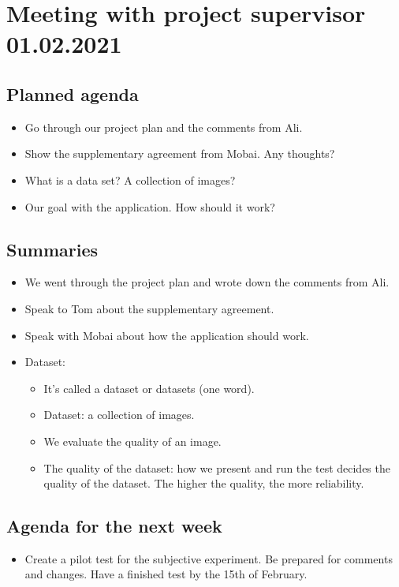 \newpage

\section*{Meeting with project supervisor 01.02.2021}
\subsection*{Planned agenda}
\begin{itemize}
    \item Go through our project plan and the comments from Ali.
    \item Show the supplementary agreement from Mobai. Any thoughts?
    \item What is a data set? A collection of images?
    \item Our goal with the application. How should it work?
\end{itemize}

\subsection*{Summaries}
\begin{itemize}
    \item We went through the project plan and wrote down the comments from Ali.
    \item Speak to Tom about the supplementary agreement.
    \item Speak with Mobai about how the application should work. 
    \item Dataset:
    \begin{itemize}
        \item It’s called a dataset or datasets (one word). \item Dataset: a collection of images.
        \item We evaluate the quality of an image.
        \item The quality of the dataset: how we present and run the test decides the quality of the dataset. The higher the quality, the more reliability.
    \end{itemize}
\end{itemize}

\subsection*{Agenda for the next week}
\begin{itemize}
    \item Create a pilot test for the subjective experiment. Be prepared for comments and changes. Have a finished test by the 15th of February.
\end{itemize}

